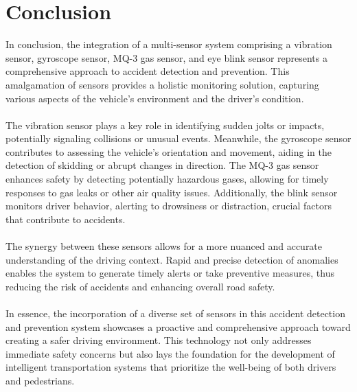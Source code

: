 \documentclass[12pt,a4paper]{report}
\begin{document}
\section{Conclusion}
\begin{justify}
    In conclusion, the integration of a multi-sensor system comprising a vibration sensor, gyroscope sensor, MQ-3 gas sensor, and eye blink sensor represents a comprehensive approach to accident detection and prevention. This amalgamation of sensors provides a holistic monitoring solution, capturing various aspects of the vehicle's environment and the driver's condition.\\\\
The vibration sensor plays a key role in identifying sudden jolts or impacts, potentially signaling collisions or unusual events. Meanwhile, the gyroscope sensor contributes to assessing the vehicle's orientation and movement, aiding in the detection of skidding or abrupt changes in direction. The MQ-3 gas sensor enhances safety by detecting potentially hazardous gases, allowing for timely responses to gas leaks or other air quality issues. Additionally, the blink sensor monitors driver behavior, alerting to drowsiness or distraction, crucial factors that contribute to accidents.\\\\
The synergy between these sensors allows for a more nuanced and accurate understanding of the driving context. Rapid and precise detection of anomalies enables the system to generate timely alerts or take preventive measures, thus reducing the risk of accidents and enhancing overall road safety.\\\\
In essence, the incorporation of a diverse set of sensors in this accident detection and prevention system showcases a proactive and comprehensive approach toward creating a safer driving environment. This technology not only addresses immediate safety concerns but also lays the foundation for the development of intelligent transportation systems that prioritize the well-being of both drivers and pedestrians.
\end{justify}
\end{document}

